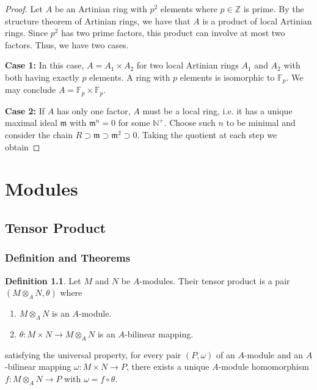 \documentclass[a4paper]{book}
\theoremstyle{definition}
\newtheorem{definition}{Definition}[]
\begin{document}
\begin{proof}
    Let \(A\) be an Artinian ring with \(p^2\) elements where \(p \in \mathbb{Z}\) is prime. By the structure theorem of Artinian rings, we have that \(A\) is a product of local Artinian rings. Since \(p^2\) has two prime factors, this product can involve at most two factors. Thus, we have two cases.

    \textbf{Case 1:} In this case, \(A = A_1 \times A_2\) for two local Artinian rings \(A_1\) and \(A_2\) with both having exactly \(p\) elements. A ring with \(p\) elements is isomorphic to \(\mathbb{F}_p\). We may conclude \(A = \mathbb{F}_p \times \mathbb{F}_p\).

    \textbf{Case 2:} If \(A\) has only one factor, \(A\) must be a local ring, i.e. it has a unique maximal ideal \(\mathfrak{m}\) with \(\mathfrak{m}^n = 0\) for some \(\mathbb{N}^+\). Choose such \(n\) to be minimal and consider the chain \(R \supset \mathfrak{m} \supset \mathfrak{m}^2 \supset 0\). Taking the quotient at each step we obtain 
\end{proof}

\part{Modules}

\chapter{Tensor Product}
\section{Definition and Theorems}

\begin{defbox}
    \begin{definition}
        Let \(M\) and \(N\) be \(A\)-modules. Their tensor product is a pair \((M \otimes_A N, \theta)\) where
        \begin{enumerate}
            \item \(M \otimes_A N\) is an \(A\)-module.
            \item \(\theta: M \times N \rightarrow M \otimes_A N\) is an \(A\)-bilinear mapping.
        \end{enumerate}
        satisfying the universal property, for every pair \((P, \omega)\) of an \(A\)-module and an \(A\)-bilinear mapping \(\omega: M \times N \rightarrow P\), there exists a unique \(A\)-module homomorphism \(f: M \otimes_A N \rightarrow P\) with \(\omega = f \circ \theta\).
    \end{definition}
\end{defbox}
\end{document}
